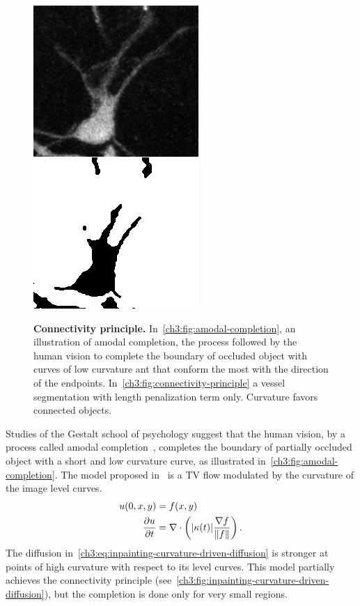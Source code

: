 \begin{figure}
{\includegraphics[scale=0.45]{figures/chapter3/vessels-bad-seg.png}
}
\caption{\textbf{Connectivity principle.} In~\cref{ch3:fig:amodal-completion}, an illustration of amodal completion, the process followed by the human vision to complete the boundary of occluded object with curves of low curvature ant that conform the most with the direction of the endpoints. In~\cref{ch3:fig:connectivity-principle} a vessel segmentation with length penalization term only. Curvature favors connected objects.}
\end{figure}

Studies of the Gestalt school of psychology suggest that the human vision, by a process called amodal completion~\cite{mumford94elastica}, completes the boundary of partially occluded object with a short and low curvature curve, as illustrated in~\cref{ch3:fig:amodal-completion}. The model proposed in~\cite{chan01nontexture} is a TV flow modulated by the curvature of the image level curves. 
\begin{align}
	u(0,x,y) &= f(x,y) \nonumber \\
	\frac{\partial u}{\partial t} &= \nabla \cdot \left( |\kappa(t)|\frac{\nabla f}{\lVert f\rVert} \right) .
	\label{ch3:eq:inpainting-curvature-driven-diffusion}
\end{align}
%
The diffusion in~\cref{ch3:eq:inpainting-curvature-driven-diffusion} is stronger at points of high curvature with respect to its level curves. This model partially achieves the connectivity principle (see~\cref{ch3:fig:inpainting-curvature-driven-diffusion}), but the completion is done only for very small regions. 

